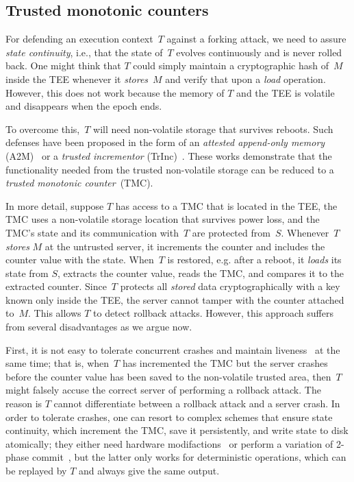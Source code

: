 \documentclass[11pt]{article}
\theoremstyle{plain-boldhead}
\theoremstyle{definition-boldhead}
\newcommand{\op}[1]{\textsl{#1}}
\begin{document}
\subsection{Trusted monotonic counters}
\label{subsec:tmc}

For defending an execution context~$T$ against a forking attack, we need to
assure \emph{state continuity}, i.e., that the state of~$T$ evolves
continuously and is never rolled back.  One might think that $T$ could simply 
maintain a cryptographic hash of~$M$ inside the TEE whenever it
\op{stores}~$M$ and verify that upon a \op{load} operation.  However, this
does not work because the memory of $T$ and the TEE is volatile and
disappears when the epoch ends.

To overcome this,~$T$ will need non-volatile storage that survives reboots.
Such defenses have been proposed in the form of an \emph{attested
  append-only memory} (A2M)~\cite{cmsk07} or a \emph{trusted incrementor}
(TrInc)~\cite{levin2009}.  These works demonstrate that the functionality
needed from the trusted non-volatile storage can be reduced to a
\emph{trusted monotonic counter}~(TMC).

In more detail, suppose $T$ has access to a TMC that is located in the TEE,
the TMC uses a non-volatile storage location that survives power loss, and
the TMC's state and its communication with~$T$ are protected from~$S$.
Whenever~$T$ \op{stores} $M$ at the untrusted server, it increments the
counter and includes the counter value with the state. When~$T$ is
restored, e.g. after a reboot, it \op{loads} its state from $S$, extracts
the counter value, reads the TMC, and compares it to the extracted counter.
Since~$T$ protects all \op{stored} data cryptographically with a key known
only inside the TEE, the server cannot tamper with the counter attached
to~$M$. This allows $T$ to detect rollback attacks.
% 
However, this approach suffers from several disadvantages as we argue now.
 
First, it is not easy to tolerate concurrent crashes and maintain
liveness~\cite{parno2011} at the same time; that is, when~$T$ has incremented the TMC but
the server crashes before the counter value has been saved to the
non-volatile trusted area, then~$T$ might falsely accuse the correct server
of performing a rollback attack.  The reason is $T$ cannot differentiate
between a rollback attack and a server crash.
%
In order to tolerate crashes, one can resort to complex schemes that ensure
state continuity, which increment the TMC, save it persistently, and write
state to disk atomically; they either need
hardware modifactions~\cite{strackx2014} or perform a variation of 2-phase
commit~\cite{parno2011,strpie16}, but the latter only works for deterministic
operations, which can be replayed by $T$ and always give the same output.
\end{document}
